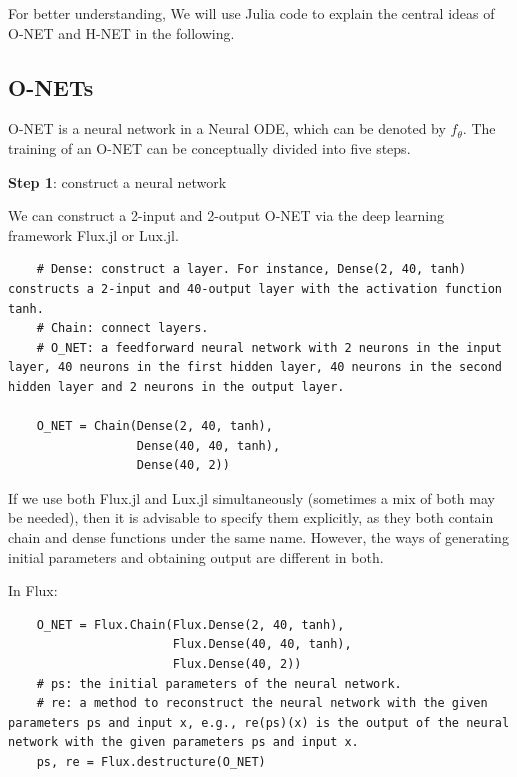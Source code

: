 \documentclass[
	parskip, 			   %
	twoside, 			   %
	DIV=14, 			   %
	BCOR=15.0mm, 		   %
	headsepline, 		   %
	open=right, 		   %
	captions=tableheading, %
	bibliography=totoc,    %
	numbers=noenddot       %
]{scrreprt}
\begin{document}
For better understanding, We will use Julia code to explain the central ideas of O-NET and H-NET in the following.

\subsection{O-NETs}
O-NET is a neural network in a Neural ODE, which can be denoted by $f_{\theta}$. The training of an O-NET can be conceptually divided into five steps.

\textbf{Step 1}: construct a neural network

 We can construct a 2-input and 2-output O-NET via the deep learning framework Flux.jl or Lux.jl.
\begin{verbatim}
    # Dense: construct a layer. For instance, Dense(2, 40, tanh) constructs a 2-input and 40-output layer with the activation function tanh.
    # Chain: connect layers.
    # O_NET: a feedforward neural network with 2 neurons in the input layer, 40 neurons in the first hidden layer, 40 neurons in the second hidden layer and 2 neurons in the output layer.

    O_NET = Chain(Dense(2, 40, tanh),
                  Dense(40, 40, tanh),
                  Dense(40, 2))
\end{verbatim}

If we use both Flux.jl and Lux.jl simultaneously (sometimes a mix of both may be needed), then it is advisable to specify them explicitly, as they both contain chain and dense functions under the same name. However, the ways of generating initial parameters and obtaining output are different in both.

In Flux:
\begin{verbatim}
    O_NET = Flux.Chain(Flux.Dense(2, 40, tanh),
                       Flux.Dense(40, 40, tanh),
                       Flux.Dense(40, 2))
    # ps: the initial parameters of the neural network. 
    # re: a method to reconstruct the neural network with the given parameters ps and input x, e.g., re(ps)(x) is the output of the neural network with the given parameters ps and input x.
    ps, re = Flux.destructure(O_NET)
\end{verbatim}
\end{document}
